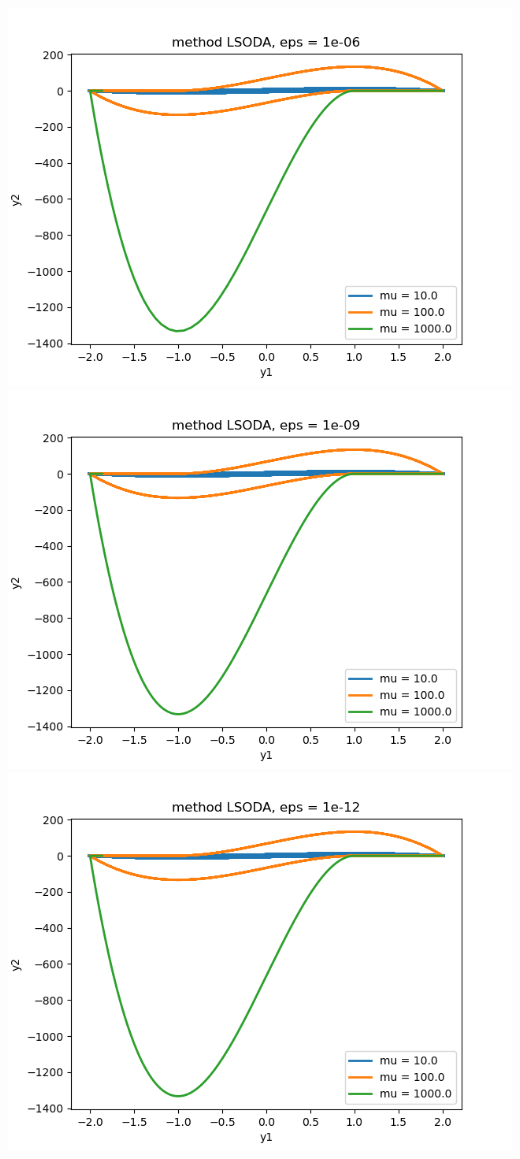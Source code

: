 \documentclass{article}
\begin{document}
\begin{enumerate}
\begin{enumerate}[label=(\alph*)]
\begin{center}
		\includegraphics[scale=.3]{hw2 p1b method LSODA, eps = 1e-06}
		\includegraphics[scale=.3]{hw2 p1b method LSODA, eps = 1e-09}
		\includegraphics[scale=.3]{hw2 p1b method LSODA, eps = 1e-12}

\end{center}
\end{enumerate}
\end{enumerate}
\end{document}

